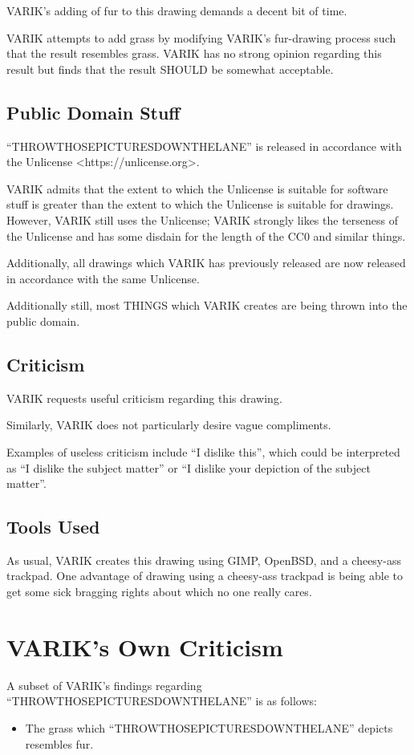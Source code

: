 \documentclass{report}
\begin{document}
VARIK's adding of fur to this drawing demands a decent bit of time.

VARIK attempts to add grass by modifying VARIK's fur-drawing process such that the result resembles grass.  VARIK has no strong opinion regarding this result but finds that the result SHOULD be somewhat acceptable.

\subsection{Public Domain Stuff}
``THROWTHOSEPICTURESDOWNTHELANE'' is released in accordance with the Unlicense <https://unlicense.org>.

VARIK admits that the extent to which the Unlicense is suitable for software stuff is greater than the extent to which the Unlicense is suitable for drawings.  However, VARIK still uses the Unlicense; VARIK strongly likes the terseness of the Unlicense and has some disdain for the length of the CC0 and similar things.

Additionally, all drawings which VARIK has previously released are now released in accordance with the same Unlicense.

Additionally still, most THINGS which VARIK creates are being thrown into the public domain.

\subsection{Criticism}
VARIK requests useful criticism regarding this drawing.

Similarly, VARIK does not particularly desire vague compliments.

Examples of useless criticism include ``I dislike this'', which could be interpreted as ``I dislike the subject matter'' or ``I dislike your depiction of the subject matter''.

\subsection{Tools Used}
As usual, VARIK creates this drawing using GIMP, OpenBSD, and a cheesy-ass trackpad.  One advantage of drawing using a cheesy-ass trackpad is being able to get some sick bragging rights about which no one really cares.

\section{VARIK's Own Criticism}
A subset of VARIK's findings regarding ``THROWTHOSEPICTURESDOWNTHELANE'' is as follows:
\begin{itemize}
	\item The grass which ``THROWTHOSEPICTURESDOWNTHELANE'' depicts resembles fur.
\end{itemize}
\end{document}
